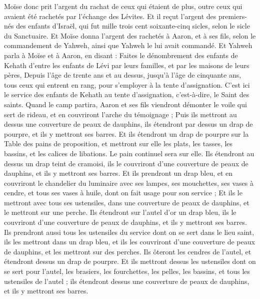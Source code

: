 \begin{multicols}{2}
Moïse donc prit l'argent du rachat de ceux qui étaient de plus, outre ceux qui avaient été rachetés par l'échange des Lévites.
Et il reçut l'argent des premiers-nés des enfants d'Israël, qui fut mille trois cent soixante-cinq sicles, selon le sicle du Sanctuaire.
Et Moïse donna l'argent des rachetés à Aaron, et à ses fils, selon le commandement de Yahweh, ainsi que Yahweh le lui avait commandé.
\VerseOne{}Et Yahweh parla à Moïse et à Aaron, en disant :
Faites le dénombrement des enfants de Kehath d'entre les enfants de Lévi par leurs familles, et par les maisons de leurs pères,
Depuis l'âge de trente ans et au dessus, jusqu'à l'âge de cinquante ans, tous ceux qui entrent en rang, pour s'employer à la tente d'assignation.
C'est ici le service des enfants de Kehath au tente d'assignation, c'est-à-dire, le Saint des saints.
Quand le camp partira, Aaron et ses fils viendront démonter le voile qui sert de rideau, et en couvriront l'arche du témoignage ;
Puis ils mettront au dessus une couverture de peaux de dauphins, ils étendront par dessus un drap de pourpre, et ils y mettront ses barres.
Et ils étendront un drap de pourpre sur la Table des pains de proposition, et mettront sur elle les plats, les tasses, les bassins, et les calices de libations. Le pain continuel sera sur elle.
Ils étendront au dessus un drap teint de cramoisi, ils le couvriront d'une couverture de peaux de dauphins, et ils y mettront ses barres.
Et ils prendront un drap bleu, et en couvriront le chandelier du luminaire avec ses lampes, ses mouchettes, ses vases à cendre, et tous ses vases à huile, dont on fait usage pour son service ;
Et ils le mettront avec tous ses ustensiles, dans une couverture de peaux de dauphins, et le mettront sur une perche.
Ils étendront sur l'autel d'or un drap bleu, ils le couvriront d'une couverture de peaux de dauphins, et ils y mettront ses barres.
Ils prendront aussi tous les ustensiles du service dont on se sert dans le lieu saint, ils les mettront dans un drap bleu, et ils les couvriront d'une couverture de peaux de dauphins, et les mettront sur des perches.
Ils ôteront les cendres de l'autel, et étendront dessus un drap de pourpre.
Et ils mettront dessus les ustensiles dont on se sert pour l'autel, les brasiers, les fourchettes, les pelles, les bassins, et tous les ustensiles de l'autel ; ils étendront dessus une couverture de peaux de dauphins, et ils y mettront ses barres.

\end{multicols}

